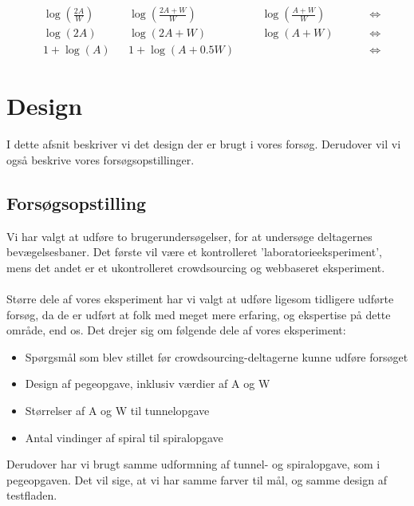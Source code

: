\begin{align*}
&\log\left(\frac{2A}{W}\right) &&\log\left(\frac{2A+W}{W}\right) &&&\log\left(\frac{A+W}{W}\right) &&&&\Leftrightarrow\\
&\log\left(2A\right) &&\log\left(2A+W\right) &&&\log\left(A+W\right) &&&&\Leftrightarrow\\
&1+\log(A) && 1+\log(A+0.5W) &&& &&&&\Leftrightarrow
\end{align*}



\newpage
{}
\chapter*{Design}
I dette afsnit beskriver vi det design der er brugt i vores forsøg. Derudover vil vi også beskrive vores forsøgsopstillinger.

\section*{Forsøgsopstilling}
Vi har valgt at udføre to brugerundersøgelser, for at undersøge deltagernes bevægelsesbaner. Det første vil være et kontrolleret 'laboratorieeksperiment', mens det andet er et ukontrolleret crowdsourcing og webbaseret eksperiment.\\\\
Større dele af vores eksperiment har vi valgt at udføre ligesom tidligere udførte forsøg, da de er udført at folk med meget mere erfaring, og ekspertise på dette område, end os.
Det drejer sig om følgende dele af vores eksperiment:
\begin{itemize}
\item Spørgsmål som blev stillet før crowdsourcing-deltagerne kunne udføre forsøget\cite{goldberg2015}
\item Design af pegeopgave, inklusiv værdier af A og W\cite{goldberg2015}
\item Størrelser af A og W til tunnelopgave\cite{accot1997}
\item Antal vindinger af spiral til spiralopgave\cite{accot1997}
\end{itemize}
Derudover har vi brugt samme udformning af tunnel- og spiralopgave, som i pegeopgaven. Det vil sige, at vi har samme farver til mål, og samme design af testfladen.

